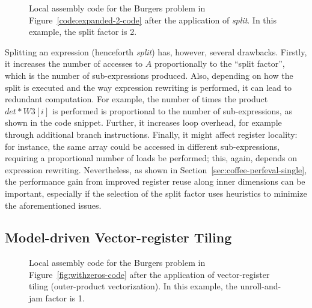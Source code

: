 \begin{figure}
\centering
\label{code:burgers-split}
\scriptsize

\caption{Local assembly code for the Burgers problem in Figure~\ref{code:expanded-2-code} after the application of \emph{split}. In this example, the split factor is 2.}
\end{figure}

Splitting an expression (henceforth \emph{split}) has, however, several drawbacks. Firstly, it increases the number of accesses to $A$ proportionally to the ``split factor'', which is the number of sub-expressions produced. Also, depending on how the split is executed and the way expression rewriting is performed, it can lead to redundant computation. For example, the number of times the product $det*W3[i]$ is performed is proportional to the number of sub-expressions, as shown in the code snippet. Further, it increases loop overhead, for example through additional branch instructions. Finally, it might affect register locality: for instance, the same array could be accessed in different sub-expressions, requiring a proportional number of loads be performed; this, again, depends on expression rewriting. Nevertheless, as shown in Section~\ref{sec:coffee-perfeval-single}, the performance gain from improved register reuse along inner dimensions can be important, especially if the selection of the split factor uses heuristics to minimize the aforementioned issues.

\subsection{Model-driven Vector-register Tiling}
\label{sec:coffee-opvect}

\begin{figure}
\centering
\label{code:burgers-opvect}
\scriptsize

\caption{Local assembly code for the Burgers problem in Figure~\ref{fig:withzeros-code} after the application of vector-register tiling (outer-product vectorization). In this example, the unroll-and-jam factor is 1.}
\end{figure}

